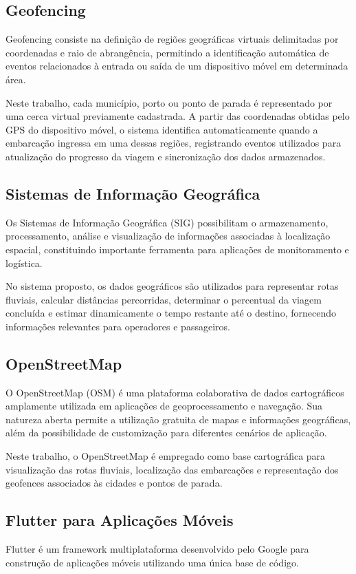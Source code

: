 \documentclass[12pt]{article}
\begin{document}
\subsection{Geofencing}
Geofencing consiste na definição de regiões geográficas virtuais delimitadas por coordenadas e raio de abrangência, permitindo a identificação automática de eventos relacionados à entrada ou saída de um dispositivo móvel em determinada área.

Neste trabalho, cada município, porto ou ponto de parada é representado por uma cerca virtual previamente cadastrada. A partir das coordenadas obtidas pelo GPS do dispositivo móvel, o sistema identifica automaticamente quando a embarcação ingressa em uma dessas regiões, registrando eventos utilizados para atualização do progresso da viagem e sincronização dos dados armazenados.

\subsection{Sistemas de Informação Geográfica}
Os Sistemas de Informação Geográfica (SIG) possibilitam o armazenamento, processamento, análise e visualização de informações associadas à localização espacial, constituindo importante ferramenta para aplicações de monitoramento e logística.

No sistema proposto, os dados geográficos são utilizados para representar rotas fluviais, calcular distâncias percorridas, determinar o percentual da viagem concluída e estimar dinamicamente o tempo restante até o destino, fornecendo informações relevantes para operadores e passageiros.

\subsection{OpenStreetMap}
O OpenStreetMap (OSM) é uma plataforma colaborativa de dados cartográficos amplamente utilizada em aplicações de geoprocessamento e navegação. Sua natureza aberta permite a utilização gratuita de mapas e informações geográficas, além da possibilidade de customização para diferentes cenários de aplicação.

Neste trabalho, o OpenStreetMap é empregado como base cartográfica para visualização das rotas fluviais, localização das embarcações e representação dos geofences associados às cidades e pontos de parada.

\subsection{Flutter para Aplicações Móveis}
Flutter é um framework multiplataforma desenvolvido pelo Google para construção de aplicações móveis utilizando uma única base de código.
\end{document}
